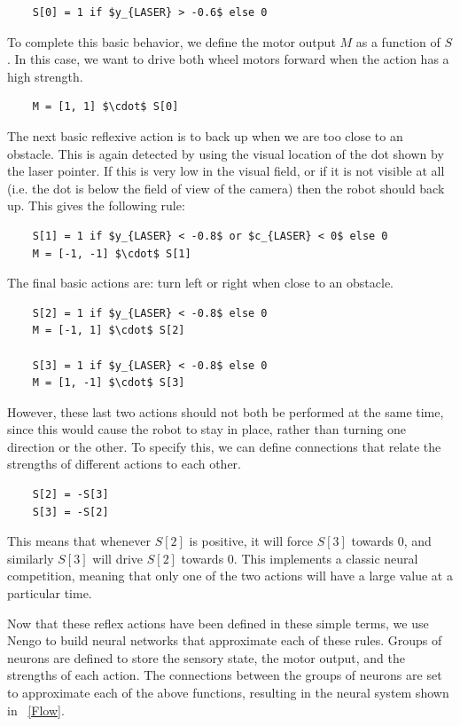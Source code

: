 \documentclass{frontiersSCNS}
\begin{document}
\begin{lstlisting}
	S[0] = 1 if $y_{LASER} > -0.6$ else 0
\end{lstlisting}

To complete this basic behavior, we define the motor output $M$ as a 
function of $S$. In this case, we want to drive both wheel motors forward 
when the action has a high strength.

\begin{lstlisting}
	M = [1, 1] $\cdot$ S[0]
\end{lstlisting}

The next basic reflexive action is to back up when we are too close to an 
obstacle. This is again detected by using the visual location of the dot
shown by the laser pointer.  If this is very low in the visual field, or if
it is not visible at all (i.e. the dot is below the field of view of the camera)
then the robot should back up.  This gives the following rule:

\begin{lstlisting}
	S[1] = 1 if $y_{LASER} < -0.8$ or $c_{LASER} < 0$ else 0
	M = [-1, -1] $\cdot$ S[1]
\end{lstlisting}

The final basic actions are: turn left or right when close to an obstacle. 

\begin{lstlisting}
	S[2] = 1 if $y_{LASER} < -0.8$ else 0
	M = [-1, 1] $\cdot$ S[2]

	S[3] = 1 if $y_{LASER} < -0.8$ else 0
	M = [1, -1] $\cdot$ S[3]
\end{lstlisting}

However, these last two actions should not both be performed at the same time,
since this would cause the robot to stay in place, rather than turning one
direction or the other. To specify this, we can define connections that relate 
the strengths of different actions to each other.

\begin{lstlisting}
	S[2] = -S[3]
	S[3] = -S[2]
\end{lstlisting}

This means that whenever $S[2]$ is positive, it will force $S[3]$ towards $0$, 
and similarly $S[3]$ will drive $S[2]$ towards $0$.  This implements a classic
neural competition, meaning that only one of the two actions will have a large
value at a particular time.

Now that these reflex actions have been defined in these simple terms, we use
Nengo to build neural networks that approximate each of these rules.  Groups
of neurons are defined to store the sensory state, the motor output, and the 
strengths of each action. The connections between the groups of neurons are 
set to approximate each of the above functions, resulting in the neural 
system shown in \figurename~\ref{Flow}. 
\end{document}
